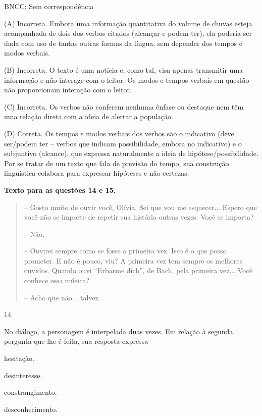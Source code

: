 BNCC: Sem correspondência

(A) Incorreta. Embora uma informação quantitativa do volume de chuvas
esteja acompanhada de dois dos verbos citados (alcançar e podem ter),
ela poderia ser dada com uso de tantas outras formas da língua, sem
depender dos tempos e modos verbais.

(B) Incorreta. O texto é uma notícia e, como tal, visa apenas transmitir
uma informação e não interage com o leitor. Os modos e tempos verbais em
questão não proporcionam interação com o leitor.

(C) Incorreta. Os verbos não conferem nenhuma ênfase ou destaque nem têm
uma relação direta com a ideia de alertar a população.

(D) Correta. Os tempos e modos verbais dos verbos são o indicativo (deve
ser/podem ter -- verbos que indicam possibilidade, embora no indicativo)
e o subjuntivo (alcance), que expressa naturalmente a ideia de
hipótese/possibilidade. Por se tratar de um texto que fala de previsão
do tempo, sua construção linguística colabora para expressar hipóteses e
não certezas.

\textbf{Texto para as questões 14 e 15.}

\begin{quote}
-- Gosto muito de ouvir você, Olívia. Sei que vou me esquecer... Espero
que você não se importe de repetir sua história outras vezes. Você se
importa?

-- Não.

-- Ouvirei sempre como se fosse a primeira vez. Isso é o que posso
prometer. E não é pouco, viu? A primeira vez tem sempre os melhores
ouvidos. Quando ouvi ``Erbarme dich'', de Bach, pela primeira vez...
Você conhece essa música?

-- Acho que não... talvez.
\end{quote}

\num{14}

No diálogo, a personagem é interpelada duas vezes. Em relação à segunda
pergunta que lhe é feita, sua resposta expressa

\begin{escolha}
\item hesitação.

\item desinteresse.

\item constrangimento.

\item desconhecimento.
\end{escolha}

